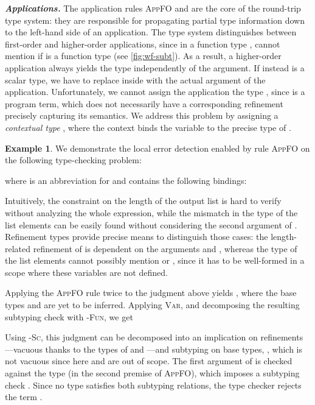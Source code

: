 \documentclass[10pt,preprint]{sigplanconf-pldi16}
\theoremstyle{definition}
\newtheorem*{example*}{Example}
\newcommand{\custompar}[1]{\parskip 0pt \textbf{\textit{#1}}}
\begin{document}
\custompar{Applications.}
The application rules \textsc{AppFO} and  are the core of the round-trip type system:
they are responsible for propagating partial type information down to the left-hand side of an application.
The type system distinguishes between first-order and higher-order applications,
since in a function type ,  cannot mention  if  is a function type (see \autoref{fig:wf-subt}).
As a result, a higher-order application always yields the type  independently of the argument.
If instead  is a scalar type, we have to replace  inside  with the actual argument of the application.
Unfortunately, we cannot assign the application  the type ,
since  is a program term, which does not necessarily have a corresponding refinement precisely capturing its semantics.
We address this problem by assigning  a \emph{contextual type} ,
where the context  binds the variable  to the precise type of .

\begin{example*}
We demonstrate the local error detection enabled by rule \textsc{AppFO}
on the following type-checking problem:

where  is an abbreviation for 
and  contains the following bindings:

Intuitively, the constraint on the length of the output list is hard to verify without analyzing the whole expression,
while the mismatch in the type of the list elements can be easily found without considering the second argument of .
Refinement types provide precise means to distinguish those cases:
the length-related refinement of  is dependent on the arguments  and ,
whereas the type of the list elements cannot possibly mention  or ,
since it has to be well-formed in a scope where these variables are not defined.

Applying the \textsc{AppFO} rule twice to the judgment above yields
,
where the base types  and  are yet to be inferred.
Applying \textsc{Var}, and decomposing the resulting subtyping check with \textsc{-Fun}, we get

Using \textsc{-Sc}, this judgment can be decomposed into an implication on refinements---vacuous thanks to the types of  and ---and subtyping on base types, ,
which is not vacuous since here  and  are out of scope.
The first argument of  is checked against the type  (in the second premise of \textsc{AppFO}),
which imposes a subtyping check .
Since no type  satisfies both subtyping relations,
the type checker rejects the term .
\end{example*}
\end{document}
